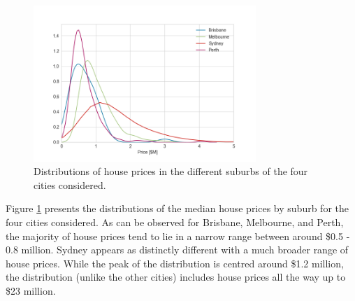 \documentclass[12pt]{article}
\begin{document}
    \begin{figure}[h!]
        \begin{center}
            \includegraphics[width=0.75\textwidth,keepaspectratio]{Figures/SuburbPriceDistributionsForAllCities}
            \caption{Distributions of house prices in the different suburbs of the four cities considered.}
            \label{Fig:SuburbPriceDistributionsForAllCities}
        \end{center}
    \end{figure}

    Figure \ref{Fig:SuburbPriceDistributionsForAllCities} presents the distributions of the median house prices by suburb for the four cities considered. As can be observed for Brisbane, Melbourne, and Perth, the majority of house prices tend to lie in a narrow range between around \$0.5 - 0.8 million. Sydney appears as distinctly different with a much broader range of house prices. While the peak of the distribution is centred around \$1.2 million, the distribution (unlike the other cities) includes house prices all the way up to \$23 million.
\end{document}
